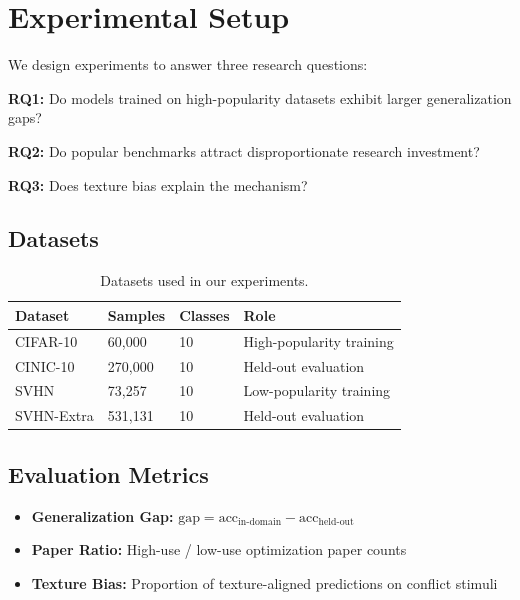 \section{Experimental Setup}

We design experiments to answer three research questions:

\textbf{RQ1:} Do models trained on high-popularity datasets exhibit larger generalization gaps?

\textbf{RQ2:} Do popular benchmarks attract disproportionate research investment?

\textbf{RQ3:} Does texture bias explain the mechanism?

\subsection{Datasets}

\begin{table}[h]
\centering
\caption{Datasets used in our experiments.}
\begin{tabular}{@{}llll@{}}
\toprule
Dataset & Samples & Classes & Role \\
\midrule
CIFAR-10 & 60,000 & 10 & High-popularity training \\
CINIC-10 & 270,000 & 10 & Held-out evaluation \\
SVHN & 73,257 & 10 & Low-popularity training \\
SVHN-Extra & 531,131 & 10 & Held-out evaluation \\
\bottomrule
\end{tabular}
\end{table}

\subsection{Evaluation Metrics}

\begin{itemize}
    \item \textbf{Generalization Gap:} $\text{gap} = \text{acc}_{\text{in-domain}} - \text{acc}_{\text{held-out}}$
    \item \textbf{Paper Ratio:} High-use / low-use optimization paper counts
    \item \textbf{Texture Bias:} Proportion of texture-aligned predictions on conflict stimuli
\end{itemize}
